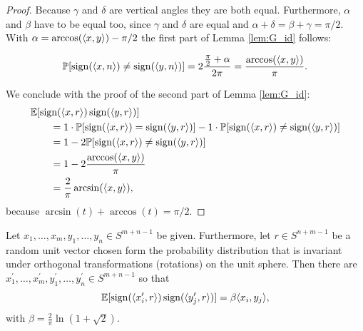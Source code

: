 \begin{proof}
\begin{minipage}{\textwidth}
			\hspace{12pt} Because $\gamma$ and $\delta$ are vertical angles they are both equal. Furthermore, $\alpha$ and $\beta$ have to be equal too, since $\gamma$ and $\delta$ are equal and $\alpha+\delta = \beta+\gamma = \pi/2$. With $\alpha = \arccos(\langle{x},{y}\rangle) - \pi/2$ the first part of Lemma \ref{lem:G_id} follows:
		\end{minipage}
		\begin{align*}
			\mathbb{P}[\operatorname{sign}(\langle{x},{n}\rangle)\neq\operatorname{sign}(\langle{y},{n}\rangle)]=2\frac{\frac{\pi}{2}+\alpha}{2\pi} = \frac{\arccos(\langle{x},{y}\rangle)}{\pi}.
		\end{align*}
		
		\noindent We conclude with the proof of the second part of Lemma \ref{lem:G_id}: 
		\begin{align*}
			&\mathbb{E}[\operatorname{sign}(\langle{x},{r}\rangle) \operatorname{sign}(\langle{y},{r}\rangle)] \\
			&\qquad= 1\cdot\mathbb{P}[\operatorname{sign}(\langle{x},{r}\rangle) = \operatorname{sign} (\langle{y},{r}\rangle )] - 1\cdot \mathbb{P}[\operatorname{sign}(\langle{x},{r}\rangle) \neq \operatorname{sign}(\langle{y},{r}\rangle)] \\
			&\qquad= 1 - 2\mathbb{P}[\operatorname{sign}(\langle{x},{r}\rangle) \neq \operatorname{sign}(\langle{y},{r}\rangle)] \\
			&\qquad= 1 - 2 \frac{\arccos(\langle{x},{y}\rangle)}{\pi} \\
			&\qquad= \frac{2}{\pi} \arcsin(\langle{x},{y}\rangle),
		\end{align*}
		because $\arcsin (t) + \arccos(t) = \pi/2$.
	\end{proof}
	
	\begin{lemma}\label{lem:krivines_trick}
		Let $x_1,\dots,x_m,y_1,\dots,y_n\in S^{m+n-1}$ be given. Furthermore, let $r\in S^{n+m-1}$ be a random unit vector chosen form the probability distribution that is invariant under orthogonal transformations (rotations) on the unit sphere. Then there are $x_1^\prime,\dots,x_m^\prime, y_1^\prime,\dots,y_n^\prime\in S^{m+n-1}$ so that
		\begin{equation}
			\mathbb{E}[\operatorname{sign}(\langle{x_i^\prime},{r}\rangle)\operatorname{sign}(\langle{y_j^\prime},{r}\rangle)] = \beta \langle{x_i},{y_j}\rangle,
			\label{eq:krivines_trick}
		\end{equation}		
		with $\beta = \frac{2}{\pi} \ln (1+\sqrt{2}).$
	\end{lemma}
	
